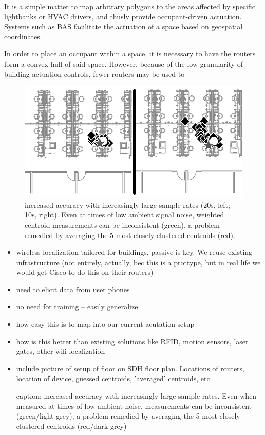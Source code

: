 It is a simple matter to map arbitrary polygons to the areas affected by specific lightbanks or HVAC drivers, and thusly provide occupant-driven actuation. Systems such as BAS facilitate the actuation of a space based on geospatial coordinates.

In order to place an occupant within a space, it is necessary to have the routers form a convex hull of said space. However, because of the low granularity of building actuation controls, fewer routers may be used to 

\begin{figure}[htb]
\begin{center}
\includegraphics[width=\linewidth]{figs/samplesize}
\end{center}
\caption{increased accuracy with increasingly large sample rates (20s, left; 10s, right). Even at times of low ambient signal noise, weighted centroid measurements can be inconsistent (green), a problem remedied by averaging the 5 most closely clustered centroids (red).}
\end{figure}

\begin{itemize}
\item wireless localization tailored for buildings, passive is key. We reuse existing infrastructure (not entirely, actually, bec this is a prottype, but in real life we would get Cisco to do this on their routers)

\item need to elicit data from user phones

\item no need for training -- easily generalize

\item how easy this is to map into our current acutation setup

\item how is this better than existing solutions like RFID, motion sensors, laser gates, other wifi localization

\item include picture of setup of floor on SDH floor plan. Locations of routers, location of device, guessed centroids, 'averaged' centroids, etc

caption: increased accuracy with increasingly large sample rates. Even when measured at times of low ambient noise, measurements can be inconsistent (green/light grey), a problem remedied by averaging the 5 most closely clustered centroids (red/dark grey)

\end{itemize}